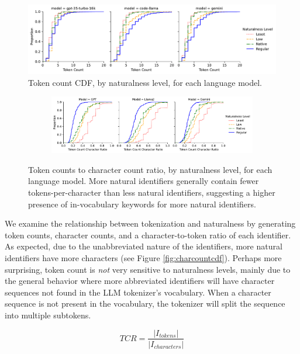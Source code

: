 \begin{figure}[ht]
  \centering
  \includegraphics[width=\textwidth]{figures/identifier-token-count-cdf.pdf}
  \caption{Token count CDF, by naturalness level, for each language model.}
  \label{fig:tokencountcdf}
\end{figure}

\begin{figure}[ht]
  \centering
  \begin{subfigure}{\textwidth}
    \centering
    \includegraphics[width=\textwidth]{figures/identifier-token-char-ratio-cdf.pdf}
  \end{subfigure}
  \caption{Token counts to character count ratio, by naturalness level, for each language model. More natural identifiers generally contain fewer tokens-per-character than less natural identifiers, suggesting a higher presence of in-vocabulary keywords for more natural identifiers.}
  \label{fig:tokencdfs}
\end{figure}

We examine the relationship between tokenization and naturalness by generating token counts, character counts, and a character-to-token ratio of each identifier.
As expected, due to the unabbreviated nature of the identifiers, more natural identifiers have more characters (see Figure \ref{fig:charcountcdf}). 
Perhaps more surprising, token count is \emph{not} very sensitive to naturalness levels, mainly due to the general behavior where more abbreviated identifiers will have character sequences not found in the LLM tokenizer's vocabulary.
When a character sequence is not present in the vocabulary, the tokenizer will split the sequence into multiple subtokens.

\begin{equation}
  \label{eq:ttcr}
  TCR = \frac{|I_{tokens}|}{|I_{characters}|}
\end{equation}

